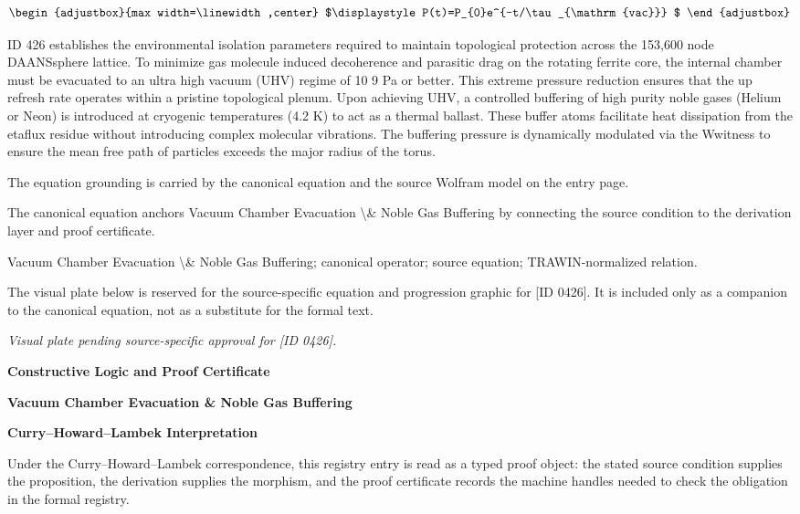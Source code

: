 \[
\begin{adjustbox}{max width=\linewidth,center}
$\displaystyle
P(t)=P_{0}e^{-t/\tau_{\mathrm{vac}}}
$
\end{adjustbox}
\]

ID 426 establishes the environmental isolation parameters required to maintain topological protection across the 153,600 node DAANSsphere lattice. To minimize gas molecule induced decoherence and parasitic drag on the rotating ferrite core, the internal chamber must be evacuated to an ultra high vacuum (UHV) regime of 10 9 Pa or better. This extreme pressure reduction ensures that the up refresh rate operates within a pristine topological plenum. Upon achieving UHV, a controlled buffering of high purity noble gases (Helium or Neon) is introduced at cryogenic temperatures (4.2 K) to act as a thermal ballast. These buffer atoms facilitate heat dissipation from the etaflux residue without introducing complex molecular vibrations. The buffering pressure is dynamically modulated via the Wwitness to ensure the mean free path of particles exceeds the major radius of the torus.

The equation grounding is carried by the canonical equation and the source Wolfram model on the entry page.

The canonical equation anchors Vacuum Chamber Evacuation \textbackslash{}\& Noble Gas Buffering by connecting the source condition to the derivation layer and proof certificate.

Vacuum Chamber Evacuation \textbackslash{}\& Noble Gas Buffering; canonical operator; source equation; TRAWIN-normalized relation.
\endgroup

\begingroup\footnotesize\sloppy
The visual plate below is reserved for the source-specific equation and progression graphic for [ID 0426]. It is included only as a companion to the canonical equation, not as a substitute for the formal text.
\par\endgroup
\begingroup\footnotesize\itshape
Visual plate pending source-specific approval for [ID 0426].
\par\endgroup

\clearpage
\begingroup\tzpsupportsetup
\noindent\textbf{\fontsize{10.8pt}{12.8pt}\selectfont [ID 0426] Constructive Logic and Proof Certificate}\par
\noindent\textbf{\fontsize{10pt}{12pt}\selectfont Vacuum Chamber Evacuation \& Noble Gas Buffering}\par
\vspace{0.45em}
\begingroup
\footnotesize
\setlength{\parskip}{0.22em}
\setlength{\parindent}{0pt}
\noindent\textbf{Curry--Howard--Lambek Interpretation}\par
Under the Curry--Howard--Lambek correspondence, this registry entry is read as a typed proof
object: the stated source condition supplies the proposition, the derivation supplies the
morphism, and the proof certificate records the machine handles needed to check the obligation
in the formal registry.

